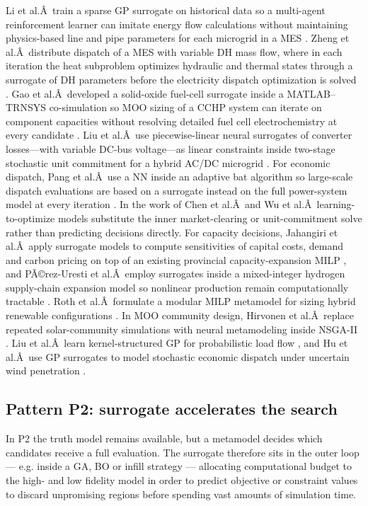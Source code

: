 Li et al.Â~train a sparse GP surrogate on historical data so a
multi-agent reinforcement learner can imitate energy flow calculations
without maintaining physics-based line and pipe parameters for each
microgrid in a MES \cite{Li2023__3}. Zheng et al.Â~distribute dispatch of a
MES with variable DH mass flow, where in each iteration the heat
subproblem optimizes hydraulic and thermal states through a surrogate of
DH parameters before the electricity dispatch optimization is solved
\cite{Zheng20231907}. Gao et al.Â~developed a solid-oxide fuel-cell surrogate
inside a MATLAB--TRNSYS co-simulation so MOO sizing of a CCHP system can
iterate on component capacities without resolving detailed fuel cell
electrochemistry at every candidate \cite{Gao2025}. Liu et al.Â~use
piecewise-linear neural surrogates of converter losses---with variable
DC-bus voltage---as linear constraints inside two-stage stochastic unit
commitment for a hybrid AC/DC microgrid \cite{Liu20242534}. For economic
dispatch, Pang et al.Â~use a NN inside an adaptive bat algorithm so
large-scale dispatch evaluations are based on a surrogate instead on the
full power-system model at every iteration \cite{Pang2023}. In the work of
Chen et al.Â~and Wu et al.Â~learning-to-optimize models substitute the
inner market-clearing or unit-commitment solve rather than predicting
decisions directly. For capacity decisions, Jahangiri et al.Â~apply
surrogate models to compute sensitivities of capital costs, demand and
carbon pricing on top of an existing provincial capacity-expansion MILP
\cite{Jahangiri20244849}, and PÃ©rez-Uresti et al.Â~employ surrogates inside a
mixed-integer hydrogen supply-chain expansion model so nonlinear
production remain computationally tractable \cite{Pérez-Uresti2023}. Roth et
al.Â~formulate a modular MILP metamodel for sizing hybrid renewable
configurations \cite{Roth2019214}. In MOO community design, Hirvonen et
al.Â~replace repeated solar-community simulations with neural
metamodeling inside NSGA-II \cite{Hirvonen2017323}. Liu et al.Â~learn
kernel-structured GP for probabilistic load flow \cite{Liu20222679}, and Hu
et al.Â~use GP surrogates to model stochastic economic dispatch under
uncertain wind penetration \cite{Hu2020}.

\subsection{Pattern P2: surrogate accelerates the search}
\label{sec:int:accelerate}

In P2 the truth model remains available, but a metamodel decides which
candidates receive a full evaluation. The surrogate therefore sits in
the outer loop --- e.g. inside a GA, BO or infill strategy ---
allocating computational budget to the high- and low fidelity model in
order to predict objective or constraint values to discard unpromising
regions before spending vast amounts of simulation time.

